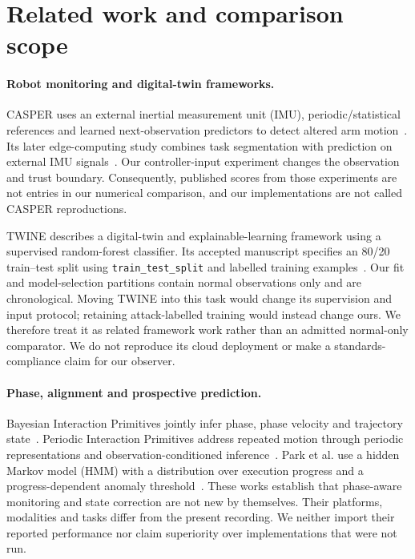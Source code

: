 \section{Related work and comparison scope}
\label{sec:related}
\paragraph{Robot monitoring and digital-twin frameworks.}
CASPER uses an external inertial measurement unit (IMU), periodic/statistical references and learned next-observation predictors to detect altered arm motion~\cite{casper2024}. Its later edge-computing study combines task segmentation with prediction on external IMU signals~\cite{edge2025}. Our controller-input experiment changes the observation and trust boundary. Consequently, published scores from those experiments are not entries in our numerical comparison, and our implementations are not called CASPER reproductions.

TWINE describes a digital-twin and explainable-learning framework using a supervised random-forest classifier. Its accepted manuscript specifies an 80/20 train--test split using \texttt{train\_test\_split} and labelled training examples~\cite{twine2026}. Our fit and model-selection partitions contain normal observations only and are chronological. Moving TWINE into this task would change its supervision and input protocol; retaining attack-labelled training would instead change ours. We therefore treat it as related framework work rather than an admitted normal-only comparator. We do not reproduce its cloud deployment or make a standards-compliance claim for our observer.

\paragraph{Phase, alignment and prospective prediction.}
Bayesian Interaction Primitives jointly infer phase, phase velocity and trajectory state~\cite{campbell2017}. Periodic Interaction Primitives address repeated motion through periodic representations and observation-conditioned inference~\cite{clark2020}. Park et al. use a hidden Markov model (HMM) with a distribution over execution progress and a progress-dependent anomaly threshold~\cite{park2016}. These works establish that phase-aware monitoring and state correction are not new by themselves. Their platforms, modalities and tasks differ from the present recording. We neither import their reported performance nor claim superiority over implementations that were not run.

